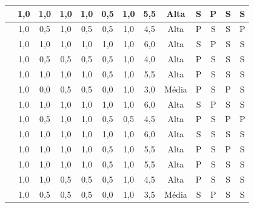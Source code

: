 \begin{scriptsize}
\begin{longtable}{|p{3cm}|c|c|c|c|c|c|c|c|c|c|c|c|}
\cite{taylor2009using}            & 1,0 & 1,0 & 1,0 & 1,0 & 0,5 & 1,0 & 5,5 & Alta  & S & P & S & S \\ \hline
\cite{halbach2009framework}       & 1,0 & 0,5 & 1,0 & 0,5 & 0,5 & 1,0 & 4,5 & Alta  & P & S & S & P \\ \hline
\cite{shi2026usability}           & 1,0 & 1,0 & 1,0 & 1,0 & 1,0 & 1,0 & 6,0 & Alta  & S & P & S & S \\ \hline
\cite{kusumaningayu2017web}       & 1,0 & 0,5 & 0,5 & 0,5 & 0,5 & 1,0 & 4,0 & Alta  & P & S & S & S \\ \hline
\cite{mastarone2007access}        & 1,0 & 1,0 & 1,0 & 1,0 & 0,5 & 1,0 & 5,5 & Alta  & P & S & S & S \\ \hline
\cite{wickramathilaka2023addressing}& 1,0 & 0,0 & 0,5 & 0,5 & 0,0 & 1,0 & 3,0 & Média & P & S & P & S \\ \hline
\cite{herrera2026applicability}   & 1,0 & 1,0 & 1,0 & 1,0 & 1,0 & 1,0 & 6,0 & Alta  & S & P & S & S \\ \hline
\cite{shafiq2018assessment}       & 1,0 & 0,5 & 1,0 & 1,0 & 0,5 & 0,5 & 4,5 & Alta  & P & S & P & P \\ \hline
\cite{gonzalez2025augmenting}     & 1,0 & 1,0 & 1,0 & 1,0 & 1,0 & 1,0 & 6,0 & Alta  & S & S & S & S \\ \hline
\cite{li2013content}              & 1,0 & 1,0 & 1,0 & 1,0 & 0,5 & 1,0 & 5,5 & Alta  & P & S & P & S \\ \hline
\cite{kymäläinen2012creating}     & 1,0 & 1,0 & 1,0 & 1,0 & 0,5 & 1,0 & 5,5 & Alta  & P & S & S & S \\ \hline
\cite{martinez2020effectiveness}  & 1,0 & 1,0 & 0,5 & 0,5 & 0,5 & 1,0 & 4,5 & Alta  & P & S & S & S \\ \hline
\cite{allah2021empathy}           & 1,0 & 0,5 & 0,5 & 0,5 & 0,0 & 1,0 & 3,5 & Média & S & P & S & S \\ \hline



\end{longtable}
\end{scriptsize}
